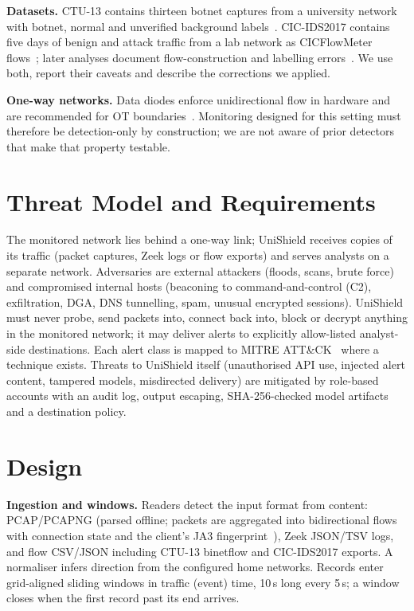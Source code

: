 \documentclass[conference]{IEEEtran}
\begin{document}
\textbf{Datasets.} CTU-13 contains thirteen botnet captures from a university network with botnet, normal and unverified background labels~\cite{garcia2014empirical}. CIC-IDS2017 contains five days of benign and attack traffic from a lab network as CICFlowMeter flows~\cite{sharafaldin2018toward}; later analyses document flow-construction and labelling errors~\cite{engelen2021troubleshooting}. We use both, report their caveats and describe the corrections we applied.

\textbf{One-way networks.} Data diodes enforce unidirectional flow in hardware and are recommended for OT boundaries~\cite{okhravi2010diodes,nist80082r3}. Monitoring designed for this setting must therefore be detection-only by construction; we are not aware of prior detectors that make that property testable.

\section{Threat Model and Requirements}
The monitored network lies behind a one-way link; UniShield receives copies of its traffic (packet captures, Zeek logs or flow exports) and serves analysts on a separate network. Adversaries are external attackers (floods, scans, brute force) and compromised internal hosts (beaconing to command-and-control (C2), exfiltration, DGA, DNS tunnelling, spam, unusual encrypted sessions). UniShield must never probe, send packets into, connect back into, block or decrypt anything in the monitored network; it may deliver alerts to explicitly allow-listed analyst-side destinations. Each alert class is mapped to MITRE ATT\&CK~\cite{strom2018attack} where a technique exists. Threats to UniShield itself (unauthorised API use, injected alert content, tampered models, misdirected delivery) are mitigated by role-based accounts with an audit log, output escaping, SHA-256-checked model artifacts and a destination policy.

\section{Design}\label{sec:design}
\textbf{Ingestion and windows.} Readers detect the input format from content: PCAP/PCAPNG (parsed offline; packets are aggregated into bidirectional flows with connection state and the client's JA3 fingerprint~\cite{althouse2017ja3}), Zeek JSON/TSV logs, and flow CSV/JSON including CTU-13 binetflow and CIC-IDS2017 exports. A normaliser infers direction from the configured home networks. Records enter grid-aligned sliding windows in traffic (event) time, 10\,s long every 5\,s; a window closes when the first record past its end arrives.
\end{document}
